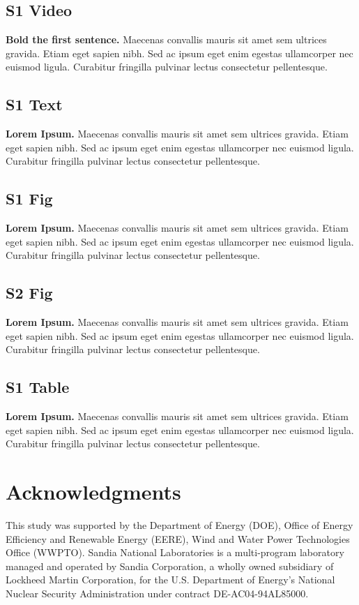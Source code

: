 \documentclass[10pt,letterpaper]{article}
\begin{document}
\subsection*{S1 Video}
\label{S1_Video}
{\bf Bold the first sentence.}  Maecenas convallis mauris sit amet sem ultrices
gravida. Etiam eget sapien nibh. Sed ac ipsum eget enim egestas ullamcorper nec
euismod ligula. Curabitur fringilla pulvinar lectus consectetur pellentesque.

\subsection*{S1 Text}
\label{S1_Text}
{\bf Lorem Ipsum.} Maecenas convallis mauris sit amet sem ultrices gravida.
Etiam eget sapien nibh. Sed ac ipsum eget enim egestas ullamcorper nec euismod
ligula. Curabitur fringilla pulvinar lectus consectetur pellentesque.

\subsection*{S1 Fig}
\label{S1_Fig}
{\bf Lorem Ipsum.} Maecenas convallis mauris sit amet sem ultrices gravida.
Etiam eget sapien nibh. Sed ac ipsum eget enim egestas ullamcorper nec euismod
ligula. Curabitur fringilla pulvinar lectus consectetur pellentesque.

\subsection*{S2 Fig}
\label{S2_Fig}
{\bf Lorem Ipsum.} Maecenas convallis mauris sit amet sem ultrices gravida.
Etiam eget sapien nibh. Sed ac ipsum eget enim egestas ullamcorper nec euismod
ligula. Curabitur fringilla pulvinar lectus consectetur pellentesque.

\subsection*{S1 Table}
\label{S1_Table}
{\bf Lorem Ipsum.} Maecenas convallis mauris sit amet sem ultrices gravida.
Etiam eget sapien nibh. Sed ac ipsum eget enim egestas ullamcorper nec euismod
ligula. Curabitur fringilla pulvinar lectus consectetur pellentesque.

\section*{Acknowledgments}

This study was supported by the Department of Energy (DOE), Office of Energy
Efficiency and Renewable Energy (EERE), Wind and Water Power Technologies Office
(WWPTO). Sandia National Laboratories is a multi-program laboratory managed and
operated by Sandia Corporation, a wholly owned subsidiary of Lockheed Martin
Corporation, for the U.S. Department of Energy's National Nuclear Security
Administration under contract DE-AC04-94AL85000.

\nolinenumbers

% 

\end{document}
